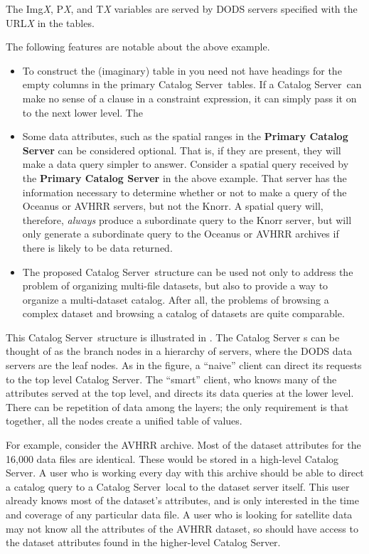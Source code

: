 \documentclass[10pt]{report}
\newcommand{\cs}{Catalog Server}
\begin{document}
\noindent
The Img\emph{X}, P\emph{X}, and T\emph{X} variables are served by DODS
servers specified with the URL\emph{X} in the tables.

The following features are notable about the above example.

\begin{itemize}
\item To construct the (imaginary) table in  you
  need not have headings for the empty columns in the primary \cs\ 
  tables.  If a \cs\ can make no sense of a clause in a constraint
  expression, it can simply pass it on to the next lower level.  The
\item Some data attributes, such as the spatial ranges in the
  \textbf{Primary \cs} can be considered optional.  That is, if they
  are present, they will make a data query simpler to answer.
  Consider a spatial query received by the \textbf{Primary \cs} in the
  above example.  That server has the information necessary to
  determine whether or not to make a query of the Oceanus or AVHRR
  servers, but not the Knorr.  A spatial query will, therefore,
  \emph{always} produce a subordinate query to the Knorr server, but
  will only generate a subordinate query to the Oceanus or AVHRR
  archives if there is likely to be data returned.
\item The proposed \cs\ structure can be used not only to address the
  problem of organizing multi-file datasets, but also to provide a way
  to organize a multi-dataset catalog.  After all, the problems of
  browsing a complex dataset and browsing a catalog of datasets are
  quite comparable.
\end{itemize}

This \cs\ structure is illustrated in .  The \cs
s can be thought of as the branch nodes in a hierarchy of servers,
where the DODS data servers are the leaf nodes.  As in the figure, a
``naive'' client can direct its requests to the top level \cs .  The
``smart'' client, who knows many of the attributes served at the top
level, and directs its data queries at the lower level.  There can be
repetition of data among the layers; the only requirement is that
together, all the nodes create a unified table of values.

For example, consider the AVHRR archive.  Most of the dataset
attributes for the 16,000 data files are identical.  These would be
stored in a high-level \cs .  A user who is working every day with
this archive should be able to direct a catalog query to a \cs\ local
to the dataset server itself.  This user already knows most of the
dataset's attributes, and is only interested in the time and coverage
of any particular data file.  A user who is looking for satellite data
may not know all the attributes of the AVHRR dataset, so should have
access to the dataset attributes found in the higher-level \cs .
\end{document}
